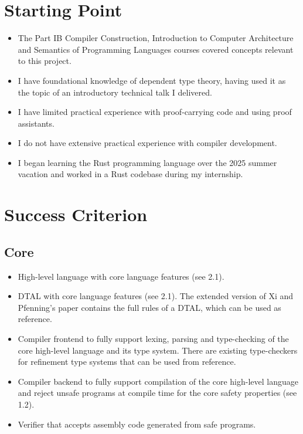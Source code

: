 \documentclass[a4paper, 12pt]{article}
\begin{document}
\section{Starting Point}
\begin{itemize}
  \item The Part IB Compiler Construction, Introduction to Computer Architecture and Semantics of Programming Languages courses covered concepts relevant to this project.
  \item I have foundational knowledge of dependent type theory, having used it as the topic of an introductory technical talk I delivered.
  \item I have limited practical experience with proof-carrying code and using proof assistants.
  \item I do not have extensive practical experience with compiler development.
  \item I began learning the Rust programming language over the 2025 summer vacation and worked in a Rust codebase during my internship.
\end{itemize}

\section{Success Criterion}

\subsection{Core}

\begin{itemize}
  \item High-level language with core language features (see 2.1).
  \item DTAL with core language features (see 2.1). The extended version of Xi and Pfenning's paper \cite{dtal} contains the full rules of a DTAL, which can be used as reference.
  \item Compiler frontend to fully support lexing, parsing and type-checking of the core high-level language and its type system. There are existing type-checkers for refinement type systems that can be used from reference.
  \item Compiler backend to fully support compilation of the core high-level language and reject unsafe programs at compile time for the core safety properties (see 1.2).
  \item Verifier that accepts assembly code generated from safe programs.
\end{itemize}
\end{document}
